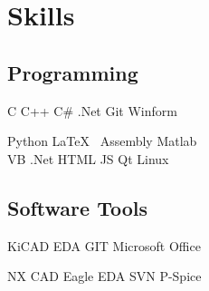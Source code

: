 \documentclass[]{deedy-resume-reversed}
\begin{document}
\begin{minipage}[t]{0.33\textwidth}
\sectionsep


\section{Skills}
\subsection{Programming}
C \textbullet{}  C++ \textbullet{} C\# .Net \textbullet{}
Git \textbullet{} Winform

Python \textbullet{} \LaTeX\ \textbullet{} Assembly \textbullet{}
Matlab \\ VB .Net \textbullet{} HTML \textbullet{} JS \textbullet{} Qt \textbullet{} Linux
\subsection{Software Tools}
KiCAD EDA \textbullet{} GIT \textbullet{} Microsoft Office

NX CAD \textbullet{} Eagle EDA \textbullet{} SVN \textbullet{} P-Spice

\sectionsep

%
%

\end{minipage} 
\hfill
\end{document}
